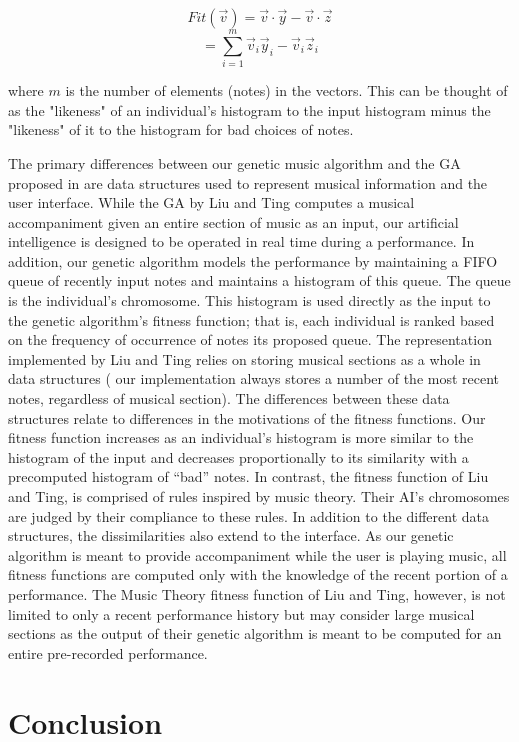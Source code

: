 \documentclass[conference]{IEEEtran}
\begin{document}
\[ Fit(\vec{v}) = \vec{v}\cdot\vec{y} - \vec{v}\cdot\vec{z} \]
\[  = \sum_{i=1}^m \vec{v}_{i}\vec{y}_{i}- \vec{v}_{i}\vec{z}_{i} \]

where $m$ is the number of elements (notes) in the vectors. This can be thought of as the "likeness" of an individual's histogram to
the input histogram minus the "likeness" of it to the histogram for bad choices of notes.

The primary differences between our genetic music algorithm and the GA proposed in \cite{b1} are data structures used to represent musical information and the user interface. While the GA by Liu and Ting computes a musical accompaniment given an entire section of music as an input, our artificial intelligence is designed to be operated in real time during a performance. In addition, our genetic algorithm models the performance by maintaining a FIFO queue of recently input notes and maintains a histogram of this queue. The queue is the individual’s chromosome.  This histogram is used directly as the input to the genetic algorithm’s fitness function; that is, each individual is ranked based on the frequency of occurrence of notes its proposed queue. 
The representation implemented by Liu and Ting relies on storing musical sections as a whole in data structures\cite{b1} ( our implementation always stores a number of the most recent notes, regardless of musical section). The differences between these data structures relate to differences in the motivations of the fitness functions. Our fitness function increases as an individual’s histogram is more similar to the histogram of the input and decreases proportionally to its similarity with a precomputed histogram of “bad” notes. In contrast, the fitness function of Liu and Ting, is comprised of rules inspired by music theory. Their AI’s chromosomes are judged by their compliance to these rules\cite{b1}.
In addition to the different data structures, the dissimilarities also extend to the interface. As our genetic algorithm is meant to provide accompaniment while the user is playing music, all fitness functions are computed only with the knowledge of the recent portion of a performance. The Music Theory fitness function of Liu and Ting, however, is not limited to only a recent performance history but may consider large musical sections as the output of their genetic algorithm is meant to be computed for an entire pre-recorded performance.

\section{Conclusion}
\end{document}

